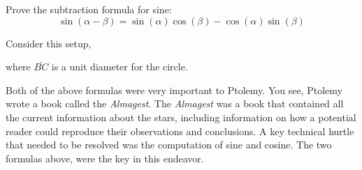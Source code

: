 \documentclass{ximera}
\begin{document}
\begin{problem}
Prove the subtraction formula for sine:
\[
\sin(\alpha - \beta) = \sin(\alpha)\cos(\beta) -
\cos(\alpha)\sin(\beta)
\]
\begin{hint}
Consider this setup, 
\begin{image}
\end{image}
where $\bar{BC}$ is a unit diameter for the circle.
\end{hint}
\end{problem}

Both of the above formulas were very important to Ptolemy. You see,
Ptolemy wrote a book called the \textit{Almagest}. The
\textit{Almagest} was a book that contained all the current
information about the stars, including information on how a potential
reader could reproduce their observations and conclusions. A key
technical hurtle that needed to be resolved was the computation of
sine and cosine. The two formulas above, were the key in this endeavor.




\end{document}
